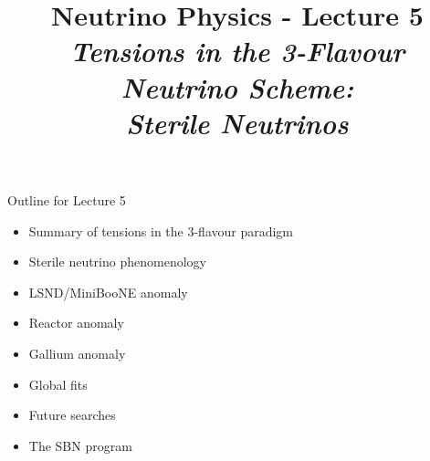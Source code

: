\renewcommand{\thislecture}{5 }

%
%

\title[Neutrino Physics / Lecture \thislecture]
{
  {\huge \color{yellow} Neutrino Physics - Lecture \thislecture} \\
  {\it Tensions in the 3-Flavour Neutrino Scheme:\\Sterile Neutrinos}\\
}



\begin{frame}[plain]
  \titlepage
\end{frame}

%
%

\begin{frame}{Outline for Lecture \thislecture}

\begin{itemize}
  \item Summary of tensions in the 3-flavour paradigm
  \item Sterile neutrino phenomenology
  \item LSND/MiniBooNE anomaly
  \item Reactor anomaly
  \item Gallium anomaly
  \item Global fits
  \item Future searches
  \item The SBN program
\end{itemize}

\end{frame}

%
%
%


